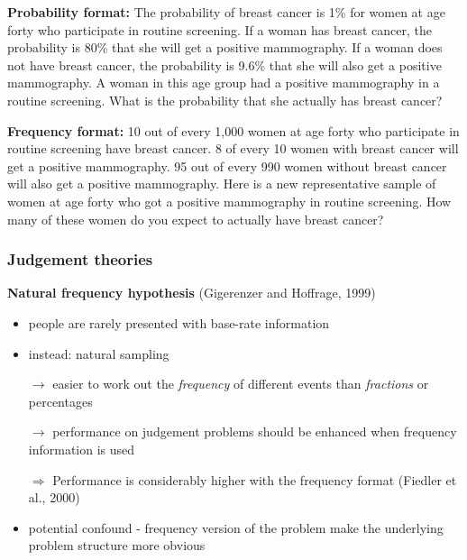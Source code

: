 \documentclass[]{beamer}
\begin{document}
\begin{frame}
\textbf{Probability format:} The probability of breast cancer is 1\% for women at
age forty who participate in routine screening. If a woman has breast
cancer, the probability is 80\% that she will get a positive mammography.
If a woman does not have breast cancer, the probability is 9.6\% that she
will also get a positive mammography. A woman in this age group had a
positive mammography in a routine screening. What is the probability
that she actually has breast cancer?\\ \vspace{3mm}

\textbf{Frequency format:} 10 out of every 1,000 women at age forty who
participate in routine screening have breast cancer. 8 of every 10 women
with breast cancer will get a positive mammography. 95 out of every 990
women without breast cancer will also get a positive mammography.
Here is a new representative sample of women at age forty who got a
positive mammography in routine screening. How many of these women
do you expect to actually have breast cancer?\\
\end{frame}



\begin{frame}
 \frametitle{Judgement theories}
\begin{overlayarea}{110mm}{80mm}
 \textbf{Natural frequency hypothesis} (Gigerenzer and Hoffrage, 1999)
\begin{itemize}
 \item people are rarely presented with base-rate information
 \item instead: natural sampling
 \item[$\rightarrow$] easier to work out the \textit{frequency} of different events than \textit{fractions} or percentages
 \item[$\rightarrow$] performance on judgement problems should be enhanced when frequency information is used
 \item[]
 \item[$\Rightarrow$] Performance is considerably higher with the frequency format (Fiedler et al., 2000) 
\item[]
 \item<2->[!] potential confound - frequency version of the problem make the underlying problem structure more obvious
\end{itemize}
\end{overlayarea}
\end{frame}
\end{document}

